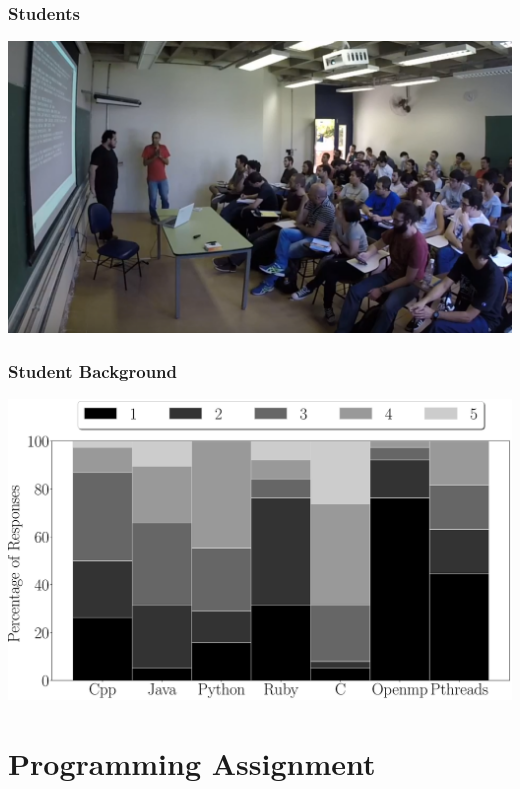 \documentclass[10pt, compress, aspectratio=169]{beamer}
\begin{document}
\begin{frame}
    \frametitle{Students}
    \begin{center}
        \includegraphics[width=.8\textwidth]{students}
    \end{center}
\end{frame}

\begin{frame}
    \frametitle{Student Background}
    \begin{center}
        \includegraphics[width=0.78\columnwidth]{background_questions}
    \end{center}
\end{frame}

\section{Programming Assignment}
\end{document}
